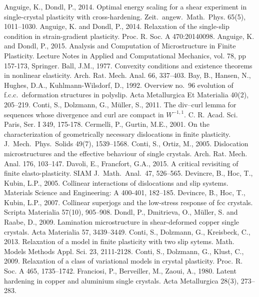 \documentclass[11pt,reqno]{amsart}
\theoremstyle{plain}
\theoremstyle{definition}
\theoremstyle{remark}
\begin{document}
\begin{thebibliography}{100}
 Anguige, K., Dondl, P., 2014. Optimal energy scaling for a shear experiment in single-crystal plasticity with cross-hardening. Zeit.~angew.~Math.~Phys. 65(5), 1011--1030.
 Anguige, K. and Dondl, P., 2014. Relaxation of the single-slip condition in strain-gradient plasticity. Proc. R. Soc. A 470:20140098.
 Anguige, K. and Dondl, P., 2015. Analysis and Computation of Microstructure in Finite Plasticity. Lecture Notes in Applied and Computational Mechanics, vol. 78, pp 157-173, Springer.
Ball, J.M., 1977.  Convexity conditions and existence theorems in nonlinear
elasticity. Arch. Rat. Mech. Anal. 66, 337--403.
Bay, B., Hansen, N., Hughes, D.A., Kuhlmann-Wilsdorf, D., 1992.
Overview no.~96 evolution of f.c.c.~deformation structures in polyslip. Acta Metallurgica Et
  Materialia 40(2), 205--219.
 Conti, S., Dolzmann, G., M\"uller, S., 2011. The div–curl lemma for sequences whose divergence and curl are compact in $W^{-1,1}$. C. R. Acad. Sci. Paris, Ser. I 349, 175-178. 
 Cermelli, P., Gurtin, M.E., 2001. On the characterization of geometrically necessary dislocations in finite plasticity. J.~Mech.~Phys.~Solids 49(7), 1539--1568.
 Conti, S., Ortiz, M., 2005. Dislocation microstructures and the effective behaviour of single crystals. Arch. Rat. Mech. Anal. 176, 103--147.
Davoli, E., Francfort, G.A., 2015. A critical revisiting of finite elasto-plasticity.
SIAM J.~Math.~Anal.~47, 526--565.
Devincre, B., Hoc, T.,  Kubin, L.P., 2005. Collinear interactions of dislocations and slip systems. Materials Science and Engineering: A 400-401, 182--185. 
 Devincre, B., Hoc, T.,  Kubin, L.P., 2007. Collinear superjogs and the low-stress response of fcc crystals.  Scripta Materialia 57(10), 905--908.
 Dondl, P., Dmitrieva, O., M{\"u}ller, S. and Raabe, D., 2009. Lamination microstructure in shear-deformed
copper single crystals.  Acta Materialia 57, 3439--3449.
 Conti, S., Dolzmann, G., Kreisbeck, C., 2013. Relaxation of a model in finite plasticity with two slip sytems. Math. Models Methods Appl. Sci. 23, 2111-2128.
 Conti, S., Dolzmann, G., Klust, C., 2009. Relaxation of a class of variational models in crystal plasticity.   Proc. R. Soc. A 465, 1735--1742.
Franciosi, P., Berveiller, M., Zaoui, A., 1980. Latent hardening in copper and aluminium single crystals.  Acta Metallurgica 28(3), 273--283.

\end{thebibliography}
\end{document}
